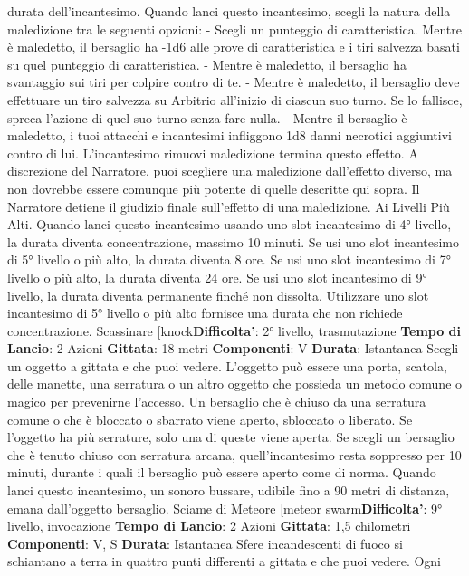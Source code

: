 \begin{multicols}{2}
durata dell’incantesimo. Quando lanci questo
incantesimo, scegli la natura della maledizione tra le
seguenti opzioni:
- Scegli un punteggio di caratteristica. Mentre è
maledetto, il bersaglio ha -1d6 alle prove di
caratteristica e i tiri salvezza basati su quel
punteggio di caratteristica.
- Mentre è maledetto, il bersaglio ha svantaggio sui
tiri per colpire contro di te.
- Mentre è maledetto, il bersaglio deve effettuare un
tiro salvezza su Arbitrio all’inizio di ciascun suo
turno. Se lo fallisce, spreca l’azione di quel suo
turno senza fare nulla.
- Mentre il bersaglio è maledetto, i tuoi attacchi e
incantesimi infliggono 1d8 danni necrotici aggiuntivi
contro di lui.
L’incantesimo rimuovi maledizione termina questo
effetto. A discrezione del Narratore, puoi scegliere una
maledizione dall’effetto diverso, ma non dovrebbe
essere comunque più potente di quelle descritte qui
sopra. Il Narratore detiene il giudizio finale sull’effetto di una
maledizione.
Ai Livelli Più Alti. Quando lanci questo incantesimo
usando uno slot incantesimo di 4° livello, la durata
diventa concentrazione, massimo 10 minuti. Se usi uno
slot incantesimo di 5° livello o più alto, la durata diventa
8 ore. Se usi uno slot incantesimo di 7° livello o più alto,
la durata diventa 24 ore. Se usi uno slot incantesimo di
9° livello, la durata diventa permanente finché non
dissolta. Utilizzare uno slot incantesimo di 5° livello o
più alto fornisce una durata che non richiede
concentrazione.
Scassinare
[knock\textbf{Difficolta'}:
2° livello, trasmutazione
\textbf{Tempo di Lancio}: 2 Azioni
\textbf{Gittata}: 18 metri
\textbf{Componenti}: V
\textbf{Durata}: Istantanea
Scegli un oggetto a gittata e che puoi vedere. L’oggetto
può essere una porta, scatola, delle manette, una
serratura o un altro oggetto che possieda un metodo
comune o magico per prevenirne l’accesso.
Un bersaglio che è chiuso da una serratura comune o
che è bloccato o sbarrato viene aperto, sbloccato o
liberato. Se l’oggetto ha più serrature, solo una di
queste viene aperta.
Se scegli un bersaglio che è tenuto chiuso con
serratura arcana, quell’incantesimo resta soppresso per
10 minuti, durante i quali il bersaglio può essere aperto
come di norma.
Quando lanci questo incantesimo, un sonoro bussare,
udibile fino a 90 metri di distanza, emana dall’oggetto
bersaglio.
Sciame di Meteore
[meteor swarm\textbf{Difficolta'}:
9° livello, invocazione
\textbf{Tempo di Lancio}: 2 Azioni
\textbf{Gittata}: 1,5 chilometri
\textbf{Componenti}: V, S
\textbf{Durata}: Istantanea
Sfere incandescenti di fuoco si schiantano a terra in
quattro punti differenti a gittata e che puoi vedere. Ogni

\end{multicols}
